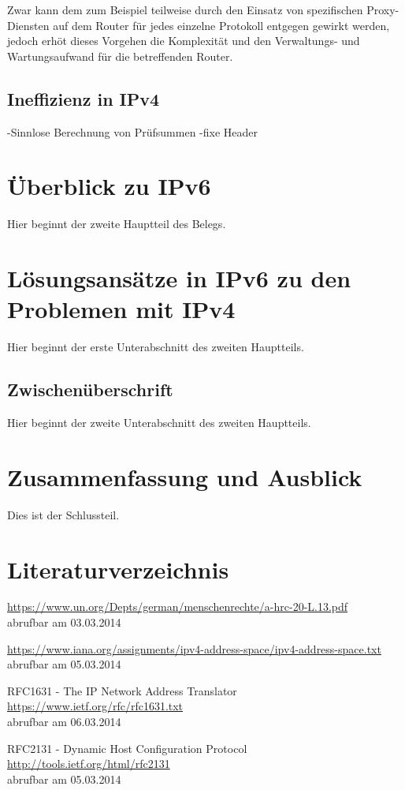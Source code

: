 \documentclass[a4paper,12pt]{scrartcl}
\begin{document}
Zwar kann dem zum Beispiel teilweise durch den Einsatz von spezifischen Proxy-Diensten auf dem Router f\"ur jedes einzelne Protokoll entgegen gewirkt werden, jedoch erh\"ot dieses Vorgehen die Komplexit\"at und den Verwaltungs- und Wartungsaufwand f\"ur die betreffenden Router.

\subsection{Ineffizienz in IPv4}
-Sinnlose Berechnung von Pr\"ufsummen
-fixe Header

\section{\"Uberblick zu IPv6}
Hier beginnt der zweite Hauptteil des Belegs.
 
\section{L\"osungsans\"atze in IPv6 zu den Problemen mit IPv4}
Hier beginnt der erste Unterabschnitt des zweiten Hauptteils.
 
\subsection{Zwischenüberschrift}
Hier beginnt der zweite Unterabschnitt des zweiten Hauptteils.
 
\section{Zusammenfassung und Ausblick}
Dies ist der Schlussteil.
\clearpage
 
\section{Literaturverzeichnis}

\begin{thebibliography}{50}

\url{https://www.un.org/Depts/german/menschenrechte/a-hrc-20-L.13.pdf}\\
abrufbar am 03.03.2014

 \url{https://www.iana.org/assignments/ipv4-address-space/ipv4-address-space.txt}\\
abrufbar am 05.03.2014

 RFC1631 - The IP Network Address Translator\\
\url{https://www.ietf.org/rfc/rfc1631.txt}\\
abrufbar am 06.03.2014

 RFC2131 - Dynamic Host Configuration Protocol\\
\url{http://tools.ietf.org/html/rfc2131}\\
abrufbar am 05.03.2014

\end{thebibliography}
 
 
\end{document}
